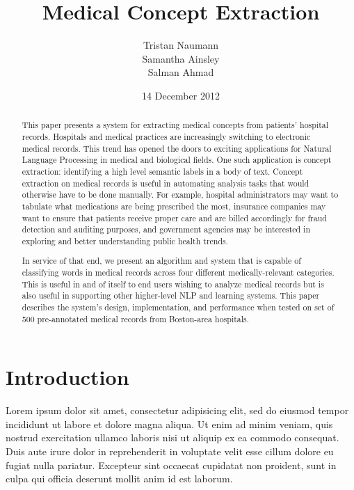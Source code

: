 \documentclass[preprint]{style}
\begin{document}
\title{Medical Concept Extraction}

\author{
\alignauthor
Tristan Naumann\\
\alignauthor
Samantha Ainsley\\
\alignauthor
Salman Ahmad\\
}

\date{14 December 2012}

\maketitle
\begin{abstract}

This paper presents a system for extracting medical concepts from patients' hospital records. Hospitals and medical practices are increasingly switching to electronic medical records. This trend has opened the doors to exciting applications for Natural Language Processing in medical and biological fields. One such application is concept extraction: identifying a high level semantic labels in a body of text. Concept extraction on medical records is useful in automating analysis tasks that would otherwise have to be done manually. For example, hospital administrators may want to tabulate what medications are being prescribed the most, insurance companies may want to ensure that patients receive proper care and are billed accordingly for fraud detection and auditing purposes, and government agencies may be interested in exploring and better understanding public health trends. 

In service of that end, we present an algorithm and system that is capable of classifying words in medical records across four different medically-relevant categories. This is useful in and of itself to end users wishing to analyze medical records but is also useful in supporting other higher-level NLP and learning systems. This paper describes the system's design, implementation, and performance when tested on set of 500 pre-annotated medical records from Boston-area hospitals.


\end{abstract}

\section{Introduction}

Lorem ipsum dolor sit amet, consectetur adipisicing elit, sed do eiusmod tempor incididunt ut labore et dolore magna aliqua. Ut enim ad minim veniam, quis nostrud exercitation ullamco laboris nisi ut aliquip ex ea commodo consequat. Duis aute irure dolor in reprehenderit in voluptate velit esse cillum dolore eu fugiat nulla pariatur. Excepteur sint occaecat cupidatat non proident, sunt in culpa qui officia deserunt mollit anim id est laborum.
\end{document}
